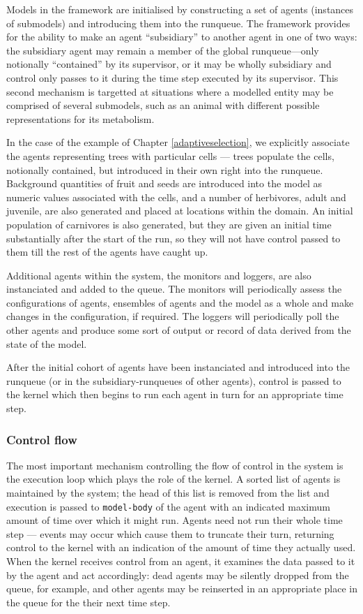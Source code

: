 Models in the framework are initialised by constructing a set of
agents (instances of submodels) and introducing them into the
runqueue. The framework provides for the ability to make an agent
``subsidiary'' to another agent in one of two ways: the subsidiary
agent may remain a member of the global runqueue---only notionally
``contained'' by its supervisor, or it may be wholly subsidiary and
control only passes to it during the time step executed by its
supervisor. This second mechanism is targetted at situations where a
modelled entity may be comprised of several submodels, such as an
animal with different possible representations for its metabolism. 

In the case of the example of Chapter \ref{adaptiveselection}, we
explicitly associate the agents representing trees with particular
cells --- trees populate the cells, notionally contained, but
introduced in their own right into the runqueue.  Background
quantities of fruit and seeds are introduced into the model as numeric
values associated with the cells, and a number of herbivores, adult
and juvenile, are also generated and placed at locations within the
domain. An initial population of carnivores is also generated, but
they are given an initial time substantially after the start of the
run, so they will not have control passed to them till the rest of the
agents have caught up.

Additional agents within the system, the monitors and loggers, are
also instanciated and added to the queue. The monitors will
periodically assess the configurations of agents, ensembles of agents
and the model as a whole and make changes in the configuration, if
required.  The loggers will periodically poll the other agents and
produce some sort of output or record of data derived from the state
of the model.

After the initial cohort of agents have been instanciated and
introduced into the runqueue (or in the subsidiary-runqueues of other
agents), control is passed to the kernel which then begins to run each
agent in turn for an appropriate time step.

\subsubsection{Control flow}

The most important mechanism controlling the flow of control in the
system is the execution loop which plays the role of the kernel. A
sorted list of agents is maintained by the system; the head of this
list is removed from the list and execution is passed to
\texttt{model-body} of the agent with an indicated maximum amount of
time over which it might run.  Agents need not run their whole time
step --- events may occur which cause them to truncate their turn,
returning control to the kernel with an indication of the amount of
time they actually used.  When the kernel receives control from an
agent, it examines the data passed to it by the agent and act
accordingly: dead agents may be silently dropped from the queue, for
example, and other agents may be reinserted in an appropriate place in
the queue for the their next time step.

